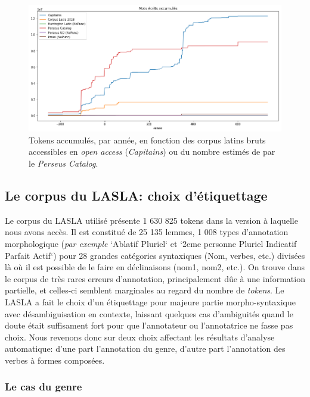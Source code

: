 \begin{figure}
    \includegraphics[width=\linewidth]{results/lemmatisation/corpus/tokens_per_year.png}
    \caption{Tokens accumulés, par année, en fonction des corpus latins bruts accessibles en \textit{open access} (\textit{Capitains}) ou du nombre estimés de par le \textit{Perseus Catalog}.}
    \label{fig:lemmatisation:corpus-entrainement}
\end{figure}

\subsection{Le corpus du LASLA: choix d'étiquettage}

Le corpus du LASLA utilisé présente 1 630 825 tokens dans la version à laquelle nous avons accès. Il est constitué de 25 135 lemmes, 1 008 types d'annotation morphologique (\textit{par exemple}  `Ablatif Pluriel` et `2eme personne Pluriel Indicatif Parfait Actif`) pour 28 grandes catégories syntaxiques (Nom, verbes, etc.) divisées là où il est possible de le faire en déclinaisons (nom1, nom2, etc.). On trouve dans le corpus de très rares erreurs d'annotation, principalement dûe à une information partielle, et celles-ci semblent marginales au regard du nombre de \textit{tokens}. Le LASLA a fait le choix d'un étiquettage pour majeure partie morpho-syntaxique avec désambiguisation en contexte, laissant quelques cas d'ambiguités quand le doute était suffisament fort pour que l'annotateur ou l'annotatrice ne fasse pas choix. Nous revenons donc sur deux choix affectant les résultats d'analyse automatique: d'une part l'annotation du genre, d'autre part l'annotation des verbes à formes composées.

\subsubsection{Le cas du genre}

